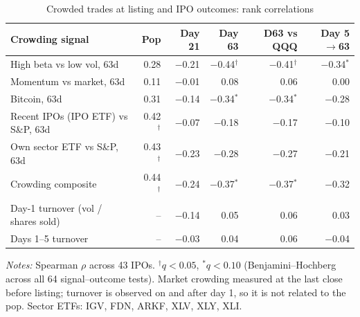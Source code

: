 \begin{table}[!htbp]\centering\footnotesize
\caption{Crowded trades at listing and IPO outcomes: rank correlations}\label{tab:crowdcorr}

\begin{threeparttable}
\begin{tabular}{lrrrrr}
\toprule
Crowding signal & Pop & Day 21 & Day 63 & D63 vs QQQ & Day 5$\to$63 \\
\midrule
High beta vs low vol, 63d & 0.28 & $-$0.21 & $-$0.44$^{\dagger}$ & $-$0.41$^{\dagger}$ & $-$0.34$^{*}$ \\
Momentum vs market, 63d & 0.11 & $-$0.01 & 0.08 & 0.06 & 0.00 \\
Bitcoin, 63d & 0.31 & $-$0.14 & $-$0.34$^{*}$ & $-$0.34$^{*}$ & $-$0.28 \\
Recent IPOs (IPO ETF) vs S\&P, 63d & 0.42$^{\dagger}$ & $-$0.07 & $-$0.18 & $-$0.17 & $-$0.10 \\
Own sector ETF vs S\&P, 63d & 0.43$^{\dagger}$ & $-$0.23 & $-$0.28 & $-$0.27 & $-$0.21 \\
Crowding composite & 0.44$^{\dagger}$ & $-$0.24 & $-$0.37$^{*}$ & $-$0.37$^{*}$ & $-$0.32 \\
\midrule
Day-1 turnover (vol / shares sold) & -- & $-$0.14 & 0.05 & 0.06 & 0.03 \\
Days 1--5 turnover & -- & $-$0.03 & 0.04 & 0.06 & $-$0.04 \\
\bottomrule
\end{tabular}
\begin{tablenotes}[flushleft]\footnotesize
\item \textit{Notes:} Spearman $\rho$ across 43 IPOs. $^{\dagger}q<0.05$, $^{*}q<0.10$ (Benjamini--Hochberg across all 64 signal--outcome tests). Market crowding measured at the last close before listing; turnover is observed on and after day 1, so it is not related to the pop. Sector ETFs: IGV, FDN, ARKF, XLV, XLY, XLI.
\end{tablenotes}
\end{threeparttable}

\end{table}
